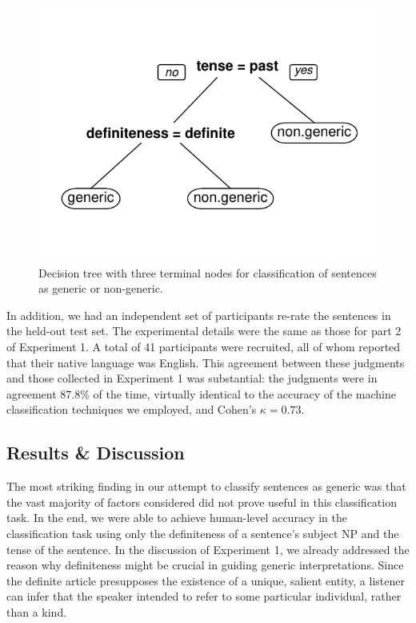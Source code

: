 \documentclass[10pt,letterpaper]{article}
\begin{document}
\begin{figure}[t]
\centering
\includegraphics[width=.8\linewidth]{figures/tree.pdf}
\caption{\label{fig:tree} Decision tree with three terminal nodes for classification of sentences as generic or non-generic.} 
\end{figure}

In addition, we had an independent set of participants re-rate the sentences in the held-out test set. The experimental details were the same as those for part 2 of Experiment 1. A total of 41 participants were recruited, all of whom reported that their native language was English. This agreement between these judgments and those collected in Experiment 1 was substantial: the judgments were in agreement 87.8\% of the time, virtually identical to the accuracy of the machine classification techniques we employed, and Cohen's \(\kappa = 0.73\).

\subsection{Results \& Discussion}

The most striking finding in our attempt to classify sentences as generic was that the vast majority of factors considered did not prove useful in this classification task. In the end, we were able to achieve human-level accuracy in the classification task using only the definiteness of a sentence's subject NP and the tense of the sentence. In the discussion of Experiment 1, we already addressed the reason why definiteness might be crucial in guiding generic interpretations. Since the definite article presupposes the existence of a unique, salient entity, a listener can infer that the speaker intended to refer to some particular individual, rather than a kind. 
\end{document}
